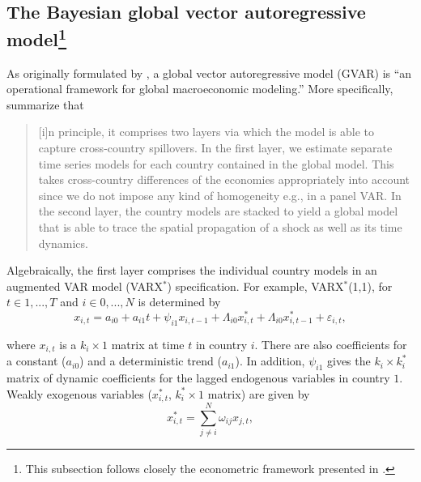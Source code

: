 \documentclass[a4paper, twoside]{templates/ociamthesis}
\begin{document}
\hypertarget{fivetwotwo}{%
\subsection[The Bayesian global vector autoregressive model]{\texorpdfstring{The Bayesian global vector autoregressive model\footnote{This subsection follows closely the econometric framework presented in \textcite[ 169-171]{feldkircher2016}.}}{The Bayesian global vector autoregressive model}}\label{fivetwotwo}}

As originally formulated by \textcite[ 159]{pesaran2004}, a global vector autoregressive model (GVAR) is ``an operational framework for global macroeconomic modeling.'' More specifically, \textcite[ 169]{feldkircher2016} summarize that

\begin{quote}
{[}i{]}n principle, it comprises two layers via which the model is able to capture cross-country spillovers. In the first layer, we estimate separate time series models for each country contained in the global model. This takes cross-country differences of the economies appropriately into account since we do not impose any kind of homogeneity e.g., in a panel VAR. In the second layer, the country models are stacked to yield a global model that is able to trace the spatial propagation of a shock as well as its time dynamics.
\end{quote}

Algebraically, the first layer comprises the individual country models in an augmented VAR model (VARX\(^*\)) specification. For example, VARX\(^*\)(1,1), for \(t \in 1, ..., T\) and \(i \in 0, ..., N\)
is determined by
\begin{equation}
x_{i,t} = a_{i0} + a_{i1}t + \psi_{i1}x_{i,t-1} + \Lambda_{i0}x_{i,t}^{\ast} + \Lambda_{i0}x_{i,t-1}^{\ast} + \varepsilon_{i,t},
\label{eq:51}
\end{equation}

\noindent where \(x_{i,t}\) is a \(k_i \times 1\) matrix at time \(t\) in country \(i\). There are also coefficients for a constant (\(a_{i0}\)) and a deterministic trend (\(a_{i1}\)). In addition, \(\psi_{i1}\) gives the \(k_i \times k_i^\ast\) matrix of dynamic coefficients for the lagged endogenous variables in country \(1\). Weakly exogenous variables (\(x_{i,t}^{\ast}\), \(k_i^* \times 1\) matrix) are given by
\begin{equation}
x_{i,t}^{\ast} = \sum_{j\neq i}^N\omega_{ij}x_{j,t},
\label{eq:52}
\end{equation}
\end{document}
